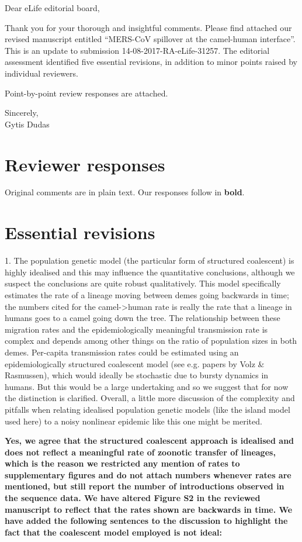 \documentclass[11pt,oneside,letterpaper]{article}
\begin{document}

Dear eLife editorial board,

Thank you for your thorough and insightful comments. Please find attached our revised manuscript entitled ``MERS-CoV spillover at the camel-human interface''.  This is an update to submission 14-08-2017-RA-eLife-31257. The editorial assessment identified five essential revisions, in addition to minor points raised by individual reviewers.

Point-by-point review responses are attached.

Sincerely,\\
Gytis Dudas

\newpage

\section*{Reviewer responses}

Original comments are in plain text.  Our responses follow in \textbf{bold}.

\section*{Essential revisions}
1. The population genetic model (the particular form of structured coalescent) is highly idealised and this may influence the quantitative conclusions, although we suspect the conclusions are quite robust qualitatively. This model specifically estimates the rate of a lineage moving between demes going backwards in time; the numbers cited for the camel->human rate is really the rate that a lineage in humans goes to a camel going down the tree. The relationship between these migration rates and the epidemiologically meaningful transmission rate is complex and depends among other things on the ratio of population sizes in both demes. Per-capita transmission rates could be estimated using an epidemiologically structured coalescent model (see e.g. papers by Volz \& Rasmussen), which would ideally be stochastic due to bursty dynamics in humans. But this would be a large undertaking and so we suggest that for now the distinction is clarified. Overall, a little more discussion of the complexity and pitfalls when relating idealised population genetic models (like the island model used here) to a noisy nonlinear epidemic like this one might be merited.

\textbf{Yes, we agree that the structured coalescent approach is idealised and does not reflect a meaningful rate of zoonotic transfer of lineages, which is the reason we restricted any mention of rates to supplementary figures and do not attach numbers whenever rates are mentioned, but still report the number of introductions observed in the sequence data. We have altered Figure S2 in the reviewed manuscript to reflect that the rates shown are backwards in time. We have added the following sentences to the discussion to highlight the fact that the coalescent model employed is not ideal:}
\end{document}
